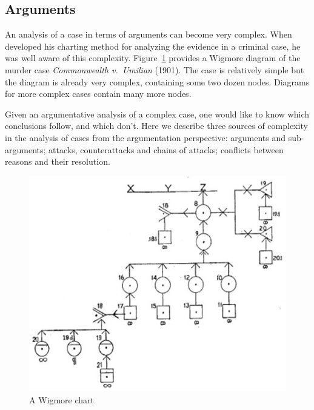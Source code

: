 \documentclass[10pt]{article}
\begin{document}
\subsection{Arguments}
\label{sec:coh-arg}

An analysis of a case in terms of arguments can become very complex. When \cite{wigmore1913} developed his charting method 
for analyzing the evidence in a criminal case, %
he was well aware of this complexity. 
Figure~\ref{fig:wigmore} provides %
a Wigmore diagram of %
the murder case \textit{Commonwealth v.\ Umilian} (1901). 
 The case is relatively simple but the diagram is already very complex, containing some two dozen nodes. 
 Diagrams for more complex cases contain many more nodes.
 
 Given an argumentative analysis of a complex case, one would like to know which conclusions follow, and which don't. 
  Here we describe three sources of complexity in the analysis
  of cases from the argumentation perspective: arguments and sub-arguments; attacks, counterattacks and chains of attacks;
  conflicts between reasons and their resolution.
  
  
  
 
 

\begin{figure}[bt]
	\centering
		\includegraphics[scale=0.7]{img/wigmore.jpg}
\caption{A Wigmore chart\label{fig:wigmore}}
\end{figure}
\end{document}
